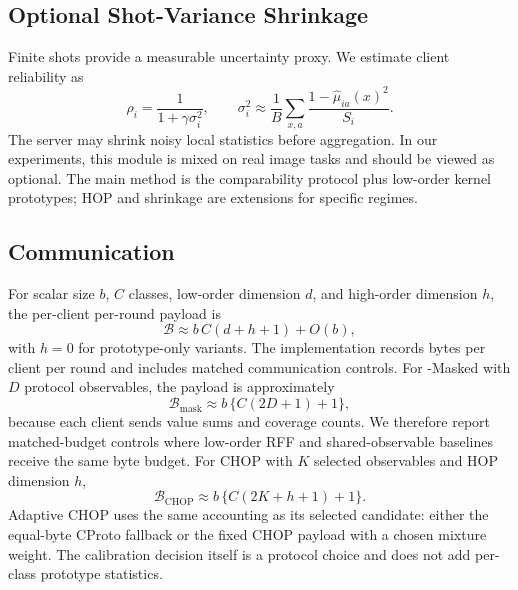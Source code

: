 \subsection{Optional Shot-Variance Shrinkage}

Finite shots provide a measurable uncertainty proxy. We estimate client reliability as
\begin{equation}
    \rho_i = \frac{1}{1+\gamma\sigma_i^2},
    \qquad
    \sigma_i^2 \approx
    \frac{1}{B}\sum_{x,a}\frac{1-\hat{\mu}_{ia}(x)^2}{S_i}.
\end{equation}
The server may shrink noisy local statistics before aggregation. In our experiments, this module is mixed on real image tasks and should be viewed as optional. The main method is the comparability protocol plus low-order kernel prototypes; HOP and shrinkage are extensions for specific regimes.

\subsection{Communication}

For scalar size \(b\), \(C\) classes, low-order dimension \(d\), and high-order dimension \(h\), the per-client per-round payload is
\begin{equation}
    \mathcal{B} \approx b\,C(d+h+1) + O(b),
\end{equation}
with \(h=0\) for prototype-only variants. The implementation records bytes per client per round and includes matched communication controls.
For \method{}-Masked with \(D\) protocol observables, the payload is approximately
\begin{equation}
    \mathcal{B}_{\mathrm{mask}}
    \approx b\,\{C(2D+1)+1\},
\end{equation}
because each client sends value sums and coverage counts. We therefore report matched-budget controls where low-order RFF and shared-observable baselines receive the same byte budget.
For CHOP with \(K\) selected observables and HOP dimension \(h\),
\begin{equation}
    \mathcal{B}_{\mathrm{CHOP}}
    \approx b\,\{C(2K+h+1)+1\}.
\end{equation}
Adaptive CHOP uses the same accounting as its selected candidate: either the equal-byte CProto fallback or the fixed CHOP payload with a chosen mixture weight. The calibration decision itself is a protocol choice and does not add per-class prototype statistics.
